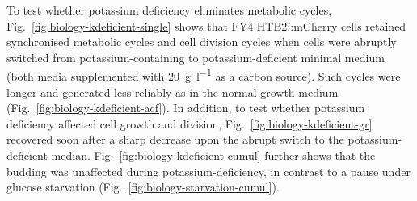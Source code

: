 To test whether potassium deficiency eliminates metabolic cycles, Fig.\ \ref{fig:biology-kdeficient-single} shows that FY4 HTB2::mCherry cells retained synchronised metabolic cycles and cell division cycles when cells were abruptly switched from potassium-containing to potassium-deficient minimal medium (both media supplemented with \SI{20}{\gram~\litre^{-1}} as a carbon source).
Such cycles were longer and generated less reliably as in the normal growth medium (Fig.\ \ref{fig:biology-kdeficient-acf}).
In addition, to test whether potassium deficiency affected cell growth and division, Fig.\ \ref{fig:biology-kdeficient-gr} recovered soon after a sharp decrease upon the abrupt switch to the potassium-deficient median.
Fig.\ \ref{fig:biology-kdeficient-cumul} further shows that the budding was unaffected during potassium-deficiency, in contrast to a pause under glucose starvation (Fig.\ \ref{fig:biology-starvation-cumul}).

